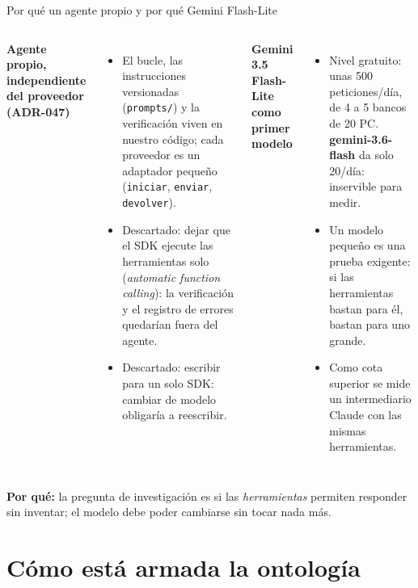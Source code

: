 \documentclass[aspectratio=169,10pt]{beamer}
\newcommand{\ttt}[1]{\texttt{\small #1}}
\newcommand{\porque}[1]{\par\smallskip\colorbox{ocre!10}{\parbox{\dimexpr\linewidth-2\fboxsep}{\footnotesize\textbf{Por qué:} #1}}}
\begin{document}
\begin{frame}{Por qué un agente propio y por qué Gemini Flash-Lite}
\begin{columns}[T]
\small
\textbf{Agente propio, independiente del proveedor (ADR-047)}
\begin{itemize}\footnotesize
\item El bucle, las instrucciones versionadas (\ttt{prompts/}) y la verificación viven en nuestro código; cada proveedor es un
      adaptador pequeño (\ttt{iniciar}, \ttt{enviar}, \ttt{devolver}).
\item Descartado: dejar que el SDK ejecute las herramientas solo (\emph{automatic function calling}): la verificación y
      el registro de errores quedarían fuera del agente.
\item Descartado: escribir para un solo SDK: cambiar de modelo obligaría a reescribir.
\end{itemize}
\small
\textbf{Gemini 3.5 Flash-Lite como primer modelo}
\begin{itemize}\footnotesize
\item Nivel gratuito: unas 500 peticiones/día, de 4 a 5 bancos de 20 PC. \textbf{gemini-3.6-flash} da solo 20/día:
      inservible para medir.
\item Un modelo pequeño es una prueba exigente: si las herramientas bastan para él, bastan para uno grande.
\item Como cota superior se mide un intermediario Claude con las mismas herramientas.
\end{itemize}
\end{columns}
\porque{la pregunta de investigación es si las \emph{herramientas} permiten responder sin inventar; el modelo debe poder
cambiarse sin tocar nada más.}
\end{frame}

\section{Cómo está armada la ontología}
\end{document}
